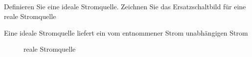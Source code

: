 \subsection{}
Definieren Sie eine ideale Stromquelle. Zeichnen Sie das Ersatzschaltbild für eine reale Stromquelle

Eine ideale Stromquelle liefert ein vom entnommener Strom unabhängigen Strom

\begin{figure}[!ht]
    \centering
    
    \caption{reale Stromquelle}
    \label{fig:realeSromquelle}
\end{figure}

